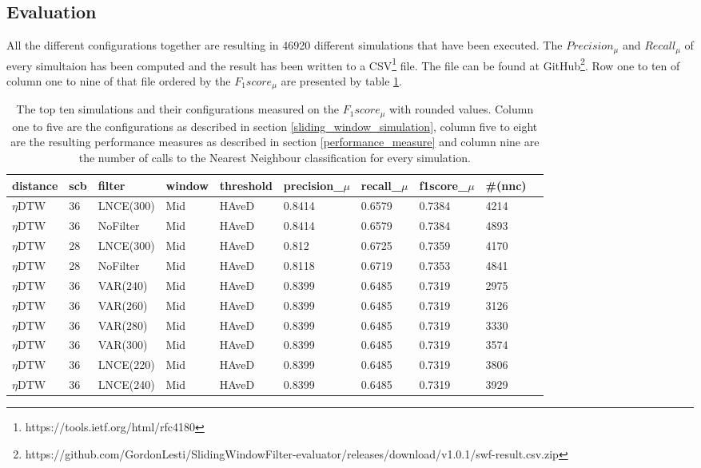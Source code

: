 \subsection{Evaluation} \label{evaluation}
All the different configurations together are resulting in 46920 different simulations that have been executed. The
$Precision_{\mu}$ and $Recall_{\mu}$ of every simultaion has been computed and the result has been written to a
CSV\footnote{https://tools.ietf.org/html/rfc4180} file. The file can be found at
GitHub\footnote{https://github.com/GordonLesti/SlidingWindowFilter-evaluator/releases/download/v1.0.1/swf-result.csv.zip}.
Row one to ten of column one to nine of that file ordered by the $F_{1}score_{\mu}$ are presented by table
\ref{tab:result}.

\begin{table}[H]
    \begin{center}
        {\scriptsize
            \begin{tabular}{l l l l l l l l l l}
                \hline
                \textbf{distance} & \textbf{scb} & \textbf{filter} & \textbf{window} & \textbf{threshold} & \textbf{precision\_$\mu$} & \textbf{recall\_$\mu$} & \textbf{f1score\_$\mu$} & \textbf{\#(nnc)}\\
                \hline
                $\eta$DTW & 36 & LNCE(300) & Mid  & HAveD & 0.8414 & 0.6579 & 0.7384 & 4214\\
                $\eta$DTW & 36 & NoFilter & Mid  & HAveD & 0.8414 & 0.6579 & 0.7384 & 4893\\
                $\eta$DTW & 28 & LNCE(300) & Mid  & HAveD & 0.812 & 0.6725 & 0.7359 & 4170\\
                $\eta$DTW & 28 & NoFilter & Mid  & HAveD & 0.8118 & 0.6719 & 0.7353 & 4841\\
                $\eta$DTW & 36 & VAR(240) & Mid  & HAveD & 0.8399 & 0.6485 & 0.7319 & 2975\\
                $\eta$DTW & 36 & VAR(260) & Mid & HAveD & 0.8399 & 0.6485 & 0.7319 & 3126\\
                $\eta$DTW & 36 & VAR(280) & Mid & HAveD & 0.8399 & 0.6485 & 0.7319 & 3330\\
                $\eta$DTW & 36 & VAR(300) & Mid & HAveD & 0.8399 & 0.6485 & 0.7319 & 3574\\
                $\eta$DTW & 36 & LNCE(220) & Mid & HAveD & 0.8399 & 0.6485 & 0.7319 & 3806\\
                $\eta$DTW & 36 & LNCE(240) & Mid & HAveD & 0.8399 & 0.6485 & 0.7319 & 3929\\
                \hline
            \end{tabular}
        }
    \end{center}
    \caption{The top ten simulations and their configurations measured on the $F_{1}score_{\mu}$ with rounded values.
    Column one to five are the configurations as described in section \ref{sliding_window_simulation}, column five to
    eight are the resulting performance measures as described in section \ref{performance_measure} and column nine are
    the number of calls to the Nearest Neighbour classification for every simulation.}
	\label{tab:result}
\end{table}

